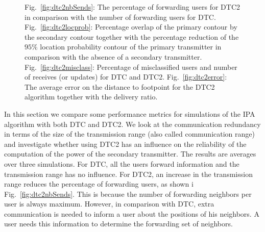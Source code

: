 \begin{figure}[!b]
\caption{Fig.~\ref{fig:dtc2nbSends}: The percentage of forwarding users for DTC2 in comparison with the number of forwarding users for DTC. Fig.~\ref{fig:dtc2locprob}: Percentage overlap of the primary contour by the secondary contour together with the percentage reduction of the $95\%$ location probability contour of the primary transmitter in comparison with the absence of a secondary transmitter. Fig.~\ref{fig:dtc2misclass}: Percentage of misclassified users and number of receives (or updates) for DTC and DTC2. Fig.~\ref{fig:dtc2error}: The average error on the distance to footpoint for the DTC2 algorithm together with the delivery ratio.}
\end{figure}

In this section we compare some performance metrics for simulations of the IPA algorithm with both DTC and DTC2. We look at the communication redundancy in terms of the size of the transmission range (also called communication range) and investigate whether using DTC2 has an influence on the reliability of the computation of the power of the secondary transmitter. The results are averages over three simulations. For DTC, all the users forward information and the transmission range has no influence. For DTC2, an increase in the transmission range reduces the percentage of forwarding users, as shown i Fig.~\ref{fig:dtc2nbSends}. This is because the number of forwarding neighbors per user is always maximum. However, in comparison with DTC, extra communication is needed to inform a user about the positions of his neighbors. A user needs this information to determine the forwarding set of neighbors. 

